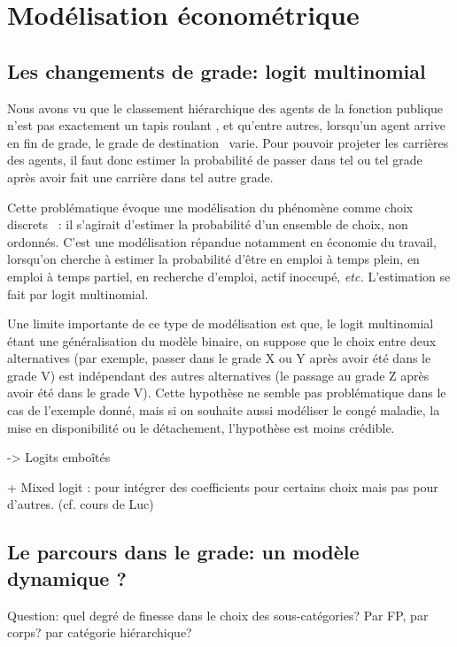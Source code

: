 \documentclass[11pt,a4paper]{article}
\begin{document}
\else \fi



\section{Modélisation économétrique}

\subsection{Les changements de grade: logit multinomial}

Nous avons vu %
que le classement hiérarchique des agents de la fonction publique n'est pas exactement un \og tapis roulant \fg, et qu'entre autres, lorsqu'un agent arrive en fin de grade, 
le grade de \og destination \fg\ varie. Pour pouvoir projeter les carrières des agents, il faut donc estimer la probabilité de passer dans tel ou tel grade après avoir fait
une carrière dans tel autre grade.

Cette problématique évoque une modélisation du phénomène comme \og choix discrets \fg\ : il s'agirait d'estimer la probabilité d'un ensemble de choix, non ordonnés.
C'est une modélisation répandue notamment en économie du travail, lorsqu'on cherche à estimer la probabilité d'être en emploi à temps plein, en emploi à temps partiel,
en recherche d'emploi, actif inoccupé, \textit{etc.} L'estimation se fait par logit multinomial.

Une limite importante de ce type de modélisation est que, le logit multinomial étant une généralisation du modèle binaire, on suppose que le choix entre deux alternatives
(par exemple, passer dans le grade X ou Y après avoir été dans le grade V) est indépendant des autres alternatives (le passage au grade Z après avoir été dans le grade V).
Cette hypothèse ne semble pas problématique dans le cas de l'exemple donné, mais si on souhaite aussi modéliser le congé maladie, la mise en disponibilité ou le détachement,
l'hypothèse est moins crédible.%

-> Logits emboîtés

+ Mixed logit : pour intégrer des coefficients pour certains choix mais pas pour d'autres. (cf. cours de Luc)


\subsection{Le parcours dans le grade: un modèle dynamique ?}





Question: quel degré de finesse dans le choix des sous-catégories? 
Par FP, par corps? par catégorie hiérarchique? 




\ifx\isEmbedded\undefined
\newpage
 

\end{document}
